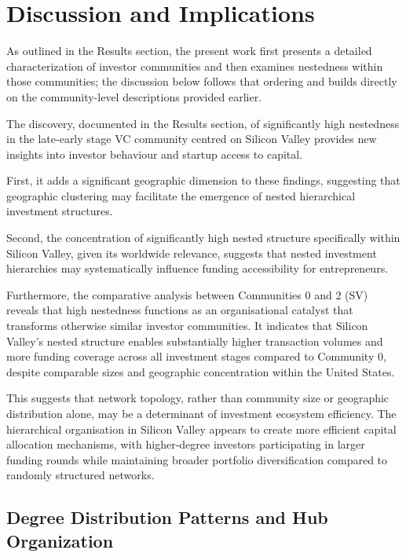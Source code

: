 \section{Discussion and Implications}

As outlined in the Results section, the present work first presents a detailed characterization of investor communities and then examines nestedness within those communities; the discussion below follows that ordering and builds directly on the community-level descriptions provided earlier.

The discovery, documented in the Results section, of significantly high nestedness in the late-early stage VC community centred on Silicon Valley provides new insights into investor behaviour and startup access to capital. 

First, it adds a significant geographic dimension to these findings, suggesting that geographic clustering may facilitate the emergence of nested hierarchical investment structures.

Second, the concentration of significantly high nested structure specifically within Silicon Valley, given its worldwide relevance, suggests that nested investment hierarchies may systematically influence funding accessibility for entrepreneurs. 

Furthermore, the comparative analysis between Communities 0 and 2 (SV) reveals that high nestedness functions as an organisational catalyst that transforms otherwise similar investor communities. It indicates that Silicon Valley's nested structure enables substantially higher transaction volumes and more funding coverage across all investment stages compared to Community 0, despite comparable sizes and geographic concentration within the United States.

This suggests that network topology, rather than community size or geographic distribution alone, may be a determinant of investment ecosystem efficiency. The hierarchical organisation in Silicon Valley appears to create more efficient capital allocation mechanisms, with higher-degree investors participating in larger funding rounds while maintaining broader portfolio diversification compared to randomly structured networks.

\subsection{Degree Distribution Patterns and Hub Organization}

